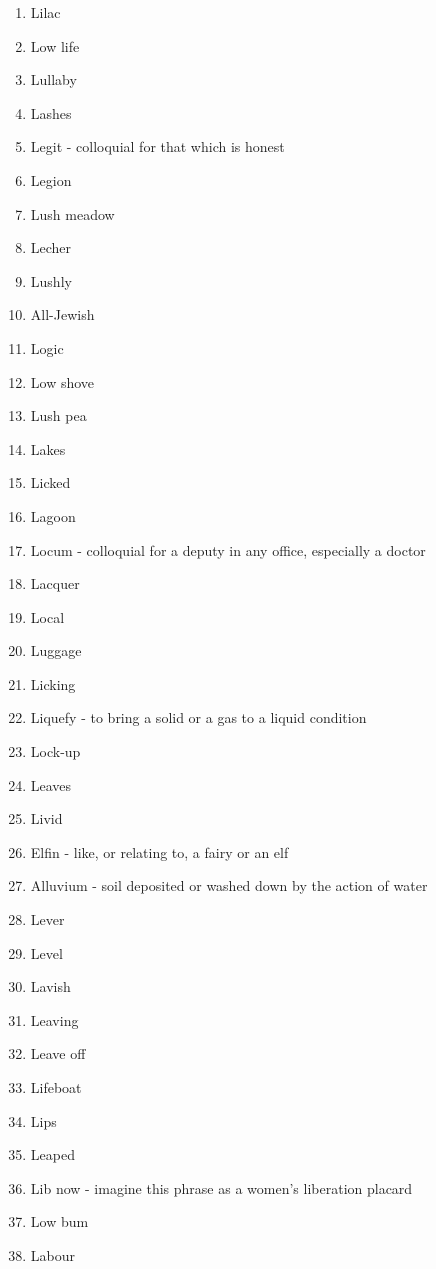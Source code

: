 \begin{enumerate}
        \item Lilac
        \item Low life
        \item Lullaby
        \item Lashes
        \item Legit - colloquial for that which is honest
        \item Legion
        \item Lush meadow
        \item Lecher
        \item Lushly
        \item All-Jewish
        \item Logic
        \item Low shove
        \item Lush pea
        \item Lakes
        \item Licked
        \item Lagoon
        \item Locum - colloquial for a deputy in any office, especially a doctor
        \item Lacquer
        \item Local
        \item Luggage
        \item Licking
        \item Liquefy - to bring a solid or a gas to a liquid condition
        \item Lock-up
        \item Leaves
        \item Livid
        \item Elfin - like, or relating to, a fairy or an elf
        \item Alluvium - soil deposited or washed down by the action of water
        \item Lever
        \item Level
        \item Lavish
        \item Leaving
        \item Leave off
        \item Lifeboat
        \item Lips
        \item Leaped
        \item Lib now - imagine this phrase as a women's liberation placard
        \item Low bum
        \item Labour

\end{enumerate}
